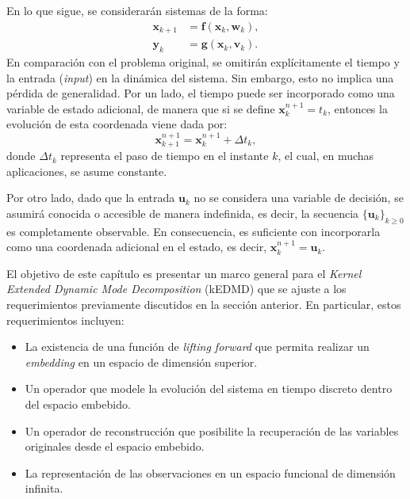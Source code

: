 En lo que sigue, se considerarán sistemas de la forma:
\begin{equation}
	\begin{aligned}
		\mathbf{x}_{k+1} &= \mathbf{f}(\mathbf{x}_k, \mathbf{w}_k), \\
		\mathbf{y}_k &= \mathbf{g}(\mathbf{x}_k, \mathbf{v}_k).
	\end{aligned}
	\label{eq:no_lin_dis_chap3}
\end{equation}
En comparación con el problema original, se omitirán explícitamente el tiempo y la entrada (\textit{input}) en la dinámica del sistema. Sin embargo, esto no implica una pérdida de generalidad. Por un lado, el tiempo puede ser incorporado como una variable de estado adicional, de manera que si se define \( \mathbf{x}_{k}^{n+1} = t_k \), entonces la evolución de esta coordenada viene dada por:
\begin{equation*}
    \mathbf{x}_{k+1}^{n+1} = \mathbf{x}_{k}^{n+1} + \Delta t_k,
\end{equation*}
donde \( \Delta t_k \) representa el paso de tiempo en el instante \( k \), el cual, en muchas aplicaciones, se asume constante.

Por otro lado, dado que la entrada \( \mathbf{u}_k \) no se considera una variable de decisión, se asumirá conocida o accesible de manera indefinida, es decir, la secuencia \( \{ \mathbf{u}_k \}_{k \geq 0} \) es completamente observable. En consecuencia, es suficiente con incorporarla como una coordenada adicional en el estado, es decir, \( \mathbf{x}_{k}^{n+1} = \mathbf{u}_k \).

El objetivo de este capítulo es presentar un marco general para el \textit{Kernel Extended Dynamic Mode Decomposition} (kEDMD) que se ajuste a los requerimientos previamente discutidos en la sección anterior. En particular, estos requerimientos incluyen:
\begin{itemize}
    \item La existencia de una función de \textit{lifting forward} que permita realizar un \textit{embedding} en un espacio de dimensión superior.
    \item Un operador que modele la evolución del sistema en tiempo discreto dentro del espacio embebido.
    \item Un operador de reconstrucción que posibilite la recuperación de las variables originales desde el espacio embebido.
    \item La representación de las observaciones en un espacio funcional de dimensión infinita.
\end{itemize}

